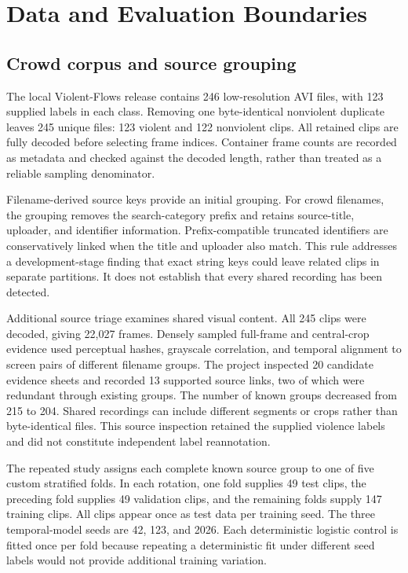 \section{Data and Evaluation Boundaries}
\subsection{Crowd corpus and source grouping}
The local Violent-Flows release contains 246 low-resolution AVI files, with 123 supplied labels in each class. Removing one byte-identical nonviolent duplicate leaves 245 unique files: 123 violent and 122 nonviolent clips. All retained clips are fully decoded before selecting frame indices. Container frame counts are recorded as metadata and checked against the decoded length, rather than treated as a reliable sampling denominator.

Filename-derived source keys provide an initial grouping. For crowd filenames, the grouping removes the search-category prefix and retains source-title, uploader, and identifier information. Prefix-compatible truncated identifiers are conservatively linked when the title and uploader also match. This rule addresses a development-stage finding that exact string keys could leave related clips in separate partitions. It does not establish that every shared recording has been detected.

Additional source triage examines shared visual content. All 245 clips were decoded, giving 22,027 frames. Densely sampled full-frame and central-crop evidence used perceptual hashes, grayscale correlation, and temporal alignment to screen pairs of different filename groups. The project inspected 20 candidate evidence sheets and recorded 13 supported source links, two of which were redundant through existing groups. The number of known groups decreased from 215 to 204. Shared recordings can include different segments or crops rather than byte-identical files. This source inspection retained the supplied violence labels and did not constitute independent label reannotation.

The repeated study assigns each complete known source group to one of five custom stratified folds. In each rotation, one fold supplies 49 test clips, the preceding fold supplies 49 validation clips, and the remaining folds supply 147 training clips. All clips appear once as test data per training seed. The three temporal-model seeds are 42, 123, and 2026. Each deterministic logistic control is fitted once per fold because repeating a deterministic fit under different seed labels would not provide additional training variation.

